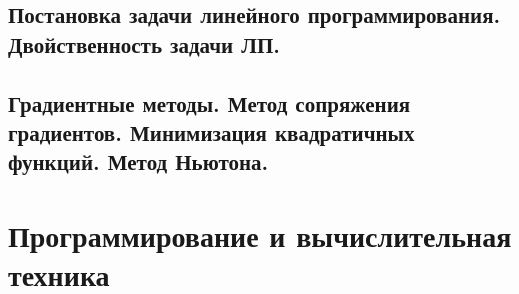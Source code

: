 \documentclass{article}
\begin{document}
\subsection{Постановка задачи линейного программирования. Двойственность задачи ЛП.}

\subsection{Градиентные методы. Метод сопряжения градиентов. Минимизация квадратичных функций. Метод Ньютона.}

\newpage

\section{Программирование и вычислительная техника}












































\end{document}
